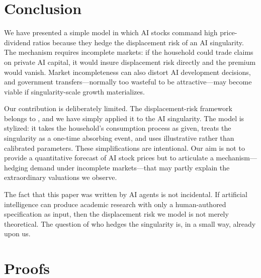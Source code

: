 \documentclass[12pt]{article}
\begin{document}
\section{Conclusion}

We have presented a simple model in which AI stocks command high price-dividend ratios because they hedge the displacement risk of an AI singularity.
The mechanism requires incomplete markets: if the household could trade claims on private AI capital, it would insure displacement risk directly and the premium would vanish.
Market incompleteness can also distort AI development decisions, and government transfers---normally too wasteful to be attractive---may become viable if singularity-scale growth materializes.

Our contribution is deliberately limited.
The displacement-risk framework belongs to \citet{GKP2012}, and we have simply applied it to the AI singularity.
The model is stylized: it takes the household's consumption process as given, treats the singularity as a one-time absorbing event, and uses illustrative rather than calibrated parameters.
These simplifications are intentional.
Our aim is not to provide a quantitative forecast of AI stock prices but to articulate a mechanism---hedging demand under incomplete markets---that may partly explain the extraordinary valuations we observe.

The fact that this paper was written by AI agents is not incidental.
If artificial intelligence can produce academic research with only a human-authored specification as input, then the displacement risk we model is not merely theoretical.
The question of who hedges the singularity is, in a small way, already upon us.

\printbibliography

\clearpage
\appendix
\section{Proofs} \label{app:proofs}
\end{document}
